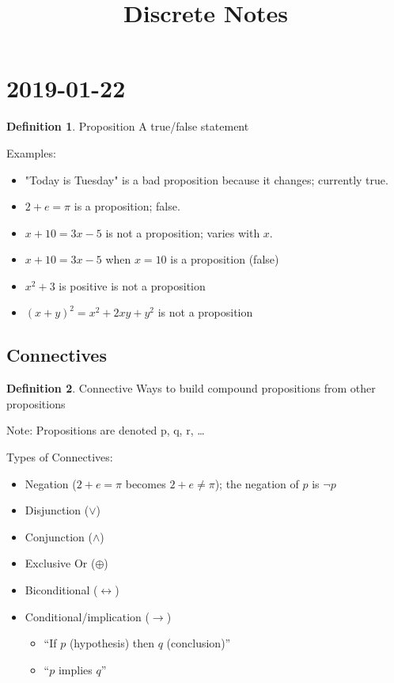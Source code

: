 \documentclass{article}
\theoremstyle{definition}
\newtheorem{definition}{Definition}[section]
\begin{document}
\title{Discrete Notes}

\section*{2019-01-22}

\begin{definition}{Proposition}
  A true/false statement
\end{definition}

Examples:
\begin{itemize}
  \item "Today is Tuesday" is a bad proposition because it changes; currently true.
  \item $2+e=\pi$ is a proposition; false.
  \item $x+10=3x-5$ is not a proposition; varies with $x$.
  \item $x+10=3x-5$ when $x=10$ is a proposition (false)
  \item $x^2 + 3$ is positive is not a proposition
  \item $(x + y)^2 = x^2 + 2xy + y^2$ is not a proposition
\end{itemize}

\subsection*{Connectives}

\begin{definition}{Connective}
  Ways to build compound propositions from other propositions
\end{definition}

Note: Propositions are denoted p, q, r, \ldots

Types of Connectives:
\begin{itemize}
  \item Negation ($2+e=\pi$ becomes $2+e \neq \pi$); the negation of $p$ is $\neg p$
  \item Disjunction ($\lor$)
  \item Conjunction ($\land$)
  \item Exclusive Or ($\oplus$)
  \item Biconditional ($\leftrightarrow$)
  \item Conditional/implication ($\rightarrow$)
    \begin{itemize}
      \item ``If $p$ (hypothesis) then $q$ (conclusion)''
      \item ``$p$ implies $q$''
    \end{itemize}
\end{itemize}
\end{document}
